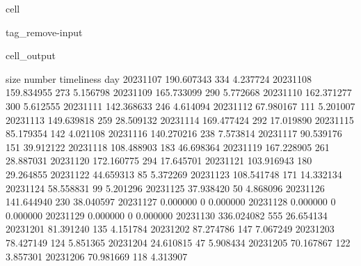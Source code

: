 \documentclass[letterpaper,10pt,english]{jupyterBook}
\begin{document}
\begin{sphinxuseclass}{cell}
\begin{sphinxuseclass}{tag_remove-input}\begin{sphinxVerbatimOutput}

\begin{sphinxuseclass}{cell_output}
\begin{sphinxVerbatim}[commandchars=\\\{\}]
                  size  number  timeliness
day                                       
2023\PYGZhy{}11\PYGZhy{}07  190.607343     334    4.237724
2023\PYGZhy{}11\PYGZhy{}08  159.834955     273    5.156798
2023\PYGZhy{}11\PYGZhy{}09  165.733099     290    5.772668
2023\PYGZhy{}11\PYGZhy{}10  162.371277     300    5.612555
2023\PYGZhy{}11\PYGZhy{}11  142.368633     246    4.614094
2023\PYGZhy{}11\PYGZhy{}12   67.980167     111    5.201007
2023\PYGZhy{}11\PYGZhy{}13  149.639818     259   28.509132
2023\PYGZhy{}11\PYGZhy{}14  169.477424     292   17.019890
2023\PYGZhy{}11\PYGZhy{}15   85.179354     142    4.021108
2023\PYGZhy{}11\PYGZhy{}16  140.270216     238    7.573814
2023\PYGZhy{}11\PYGZhy{}17   90.539176     151   39.912122
2023\PYGZhy{}11\PYGZhy{}18  108.488903     183   46.698364
2023\PYGZhy{}11\PYGZhy{}19  167.228905     261   28.887031
2023\PYGZhy{}11\PYGZhy{}20  172.160775     294   17.645701
2023\PYGZhy{}11\PYGZhy{}21  103.916943     180   29.264855
2023\PYGZhy{}11\PYGZhy{}22   44.659313      85    5.372269
2023\PYGZhy{}11\PYGZhy{}23  108.541748     171   14.332134
2023\PYGZhy{}11\PYGZhy{}24   58.558831      99    5.201296
2023\PYGZhy{}11\PYGZhy{}25   37.938420      50    4.868096
2023\PYGZhy{}11\PYGZhy{}26  141.644940     230   38.040597
2023\PYGZhy{}11\PYGZhy{}27    0.000000       0    0.000000
2023\PYGZhy{}11\PYGZhy{}28    0.000000       0    0.000000
2023\PYGZhy{}11\PYGZhy{}29    0.000000       0    0.000000
2023\PYGZhy{}11\PYGZhy{}30  336.024082     555   26.654134
2023\PYGZhy{}12\PYGZhy{}01   81.391240     135    4.151784
2023\PYGZhy{}12\PYGZhy{}02   87.274786     147    7.067249
2023\PYGZhy{}12\PYGZhy{}03   78.427149     124    5.851365
2023\PYGZhy{}12\PYGZhy{}04   24.610815      47    5.908434
2023\PYGZhy{}12\PYGZhy{}05   70.167867     122    3.857301
2023\PYGZhy{}12\PYGZhy{}06   70.981669     118    4.313907
\end{sphinxVerbatim}

\end{sphinxuseclass}\end{sphinxVerbatimOutput}

\end{sphinxuseclass}
\end{sphinxuseclass}
\sphinxstepscope
\end{document}
